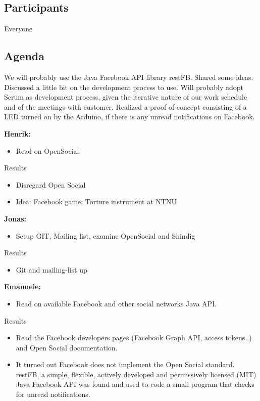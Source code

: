 \subsection{Participants}
Everyone

\subsection{Agenda}
We will probably use the Java Facebook API library restFB. 
Shared some ideas. Discussed a little bit on the development process to use.
Will probably adopt Scrum as development process, given the iterative nature of our work schedule and of the meetings with customer.
Realized a proof of concept consisting of a LED turned on by the Arduino, if there is any unread notifications on Facebook.

{\bf Henrik: } \newline
\begin{itemize}
\item Read on OpenSocial
\end{itemize}

Results
\begin{itemize}
\item Disregard Open Social
\item Idea: Facebook game: Torture instrument at NTNU
\end{itemize}

{\bf Jonas:} \newline
\begin{itemize}
\item Setup GIT, Mailing list, examine OpenSocial and Shindig
\end{itemize}

Results
\begin{itemize}
\item Git and mailing-list up
\end{itemize}

{\bf Emanuele: } \newline
\begin{itemize}
\item Read on available Facebook and other social networks Java API.
\end{itemize}

Results
\begin{itemize}
\item Read the Facebook developers pages (Facebook Graph API, access tokens..)
and Open Social documentation. 
\item It turned out Facebook does not implement the Open Social standard. restFB, a simple, flexible, actively developed and permissively licensed (MIT) Java Facebook API was found and used to code a small program that checks for unread notifications.
\end{itemize}

